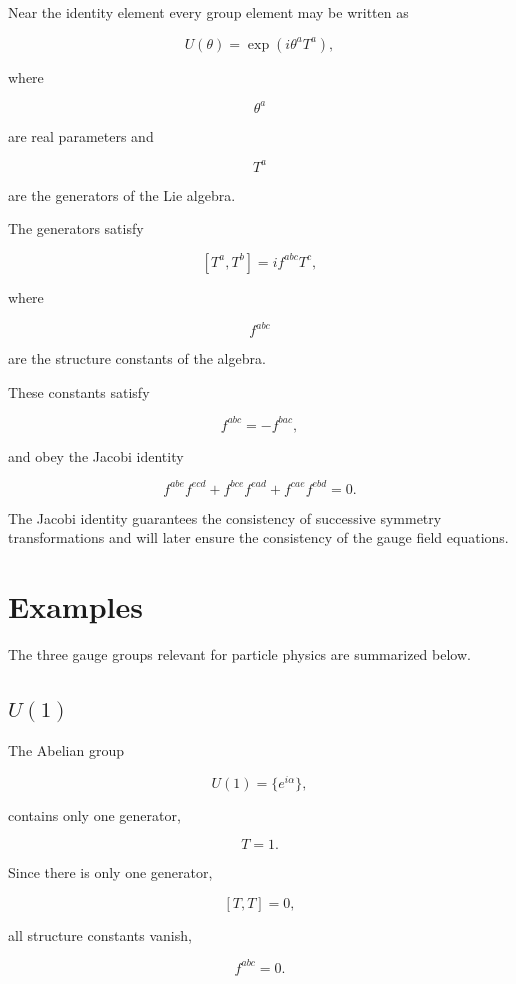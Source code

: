 Near the identity element every group element may be written as

\[
\boxed{
U(\theta)
=
\exp
\left(
i\theta^aT^a
\right),
}
\]

where

\[
\theta^a
\]

are real parameters and

\[
T^a
\]

are the generators of the Lie algebra.

The generators satisfy

\[
\boxed{
[T^a,T^b]
=
if^{abc}T^c,
}
\]

where

\[
f^{abc}
\]

are the structure constants of the algebra.

These constants satisfy

\[
f^{abc}
=
-f^{bac},
\]

and obey the Jacobi identity

\[
f^{abe}f^{ecd}
+
f^{bce}f^{ead}
+
f^{cae}f^{ebd}
=
0.
\]

The Jacobi identity guarantees the consistency of successive symmetry
transformations and will later ensure the consistency of the gauge
field equations.


\section{Examples}

The three gauge groups relevant for particle physics are summarized
below.


\subsection{$U(1)$}

The Abelian group

\[
U(1)
=
\{
e^{i\alpha}
\},
\]

contains only one generator,

\[
T=1.
\]

Since there is only one generator,

\[
[T,T]=0,
\]

all structure constants vanish,

\[
f^{abc}=0.
\]

